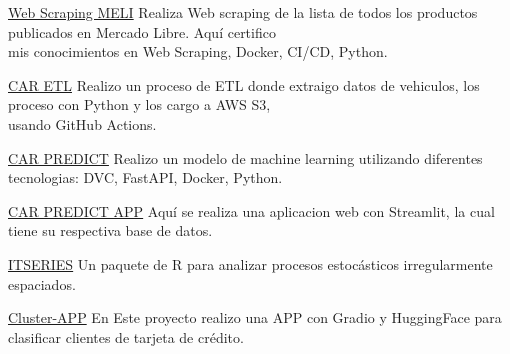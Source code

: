 {}
{\href{https://github.com/Wilmar3752/meli_scrapper}{Web Scraping MELI}}
{Realiza Web scraping de la lista de todos los productos publicados en Mercado Libre. Aquí certifico \\ mis conocimientos en Web Scraping, Docker, CI/CD, Python.}
{\jbegin
\jend}

{}
{\href{https://github.com/Wilmar3752/ETL_scraper}{CAR ETL}}
{Realizo un proceso de ETL donde extraigo datos de vehiculos, los proceso con Python y los cargo a AWS S3,\\ usando GitHub Actions.}
{\jbegin
\jend}

{}
{\href{https://github.com/Wilmar3752/car_predict}{CAR PREDICT}}
{Realizo un modelo de machine learning utilizando diferentes tecnologias: DVC, FastAPI, Docker, Python.}
{\jbegin
\jend}

{}
{\href{https://github.com/Wilmar3752/car_predict}{CAR PREDICT APP}}
{Aquí se realiza una aplicacion web con Streamlit, la cual tiene su respectiva base de datos.}
{\jbegin
\jend}

{}
{\href{https://github.com/Wilmar3752/itseries}{ITSERIES}}
{Un paquete de R para analizar procesos estocásticos irregularmente espaciados.}
{\jbegin
\jend}

{}
{\href{https://github.com/Wilmar3752/cluster-app}{Cluster-APP}}
{En Este proyecto realizo una APP con Gradio y HuggingFace para clasificar clientes de tarjeta de crédito.}
{\jbegin
\jend}








